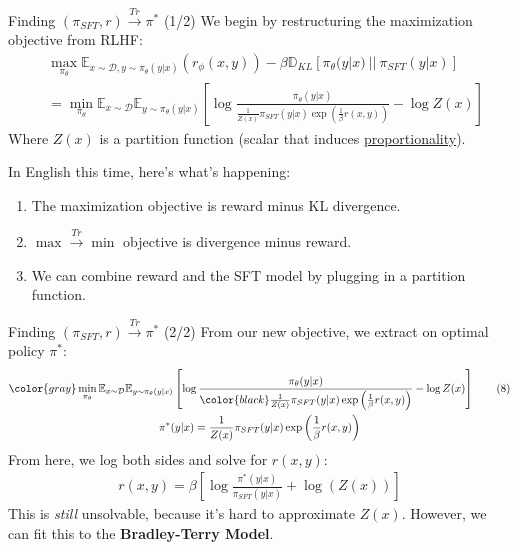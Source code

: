 \documentclass{beamer}
\begin{document}
\begin{frame}{Finding $(\pi_{SFT},r) \stackrel{Tr}{\rightarrow} \pi^*$ (1/2)}
	We begin by restructuring the maximization objective from RLHF:
	\begin{align}
		&\max_{\pi_\theta}\mathbb{E}_{x\sim\mathcal{D}, y \sim \pi_\theta(y|x)}(r_\phi(x,y)) -\beta \mathbb{D}_{KL}[\pi_\theta(y|x)~||~\pi_{SFT}(y|x)] \tag{4} \\
		&= \min_{\pi_\theta}\mathbb{E}_{x \sim \mathcal{D}}\mathbb{E}_{y \sim \pi_{\theta}(y|x)} \left[ \log \frac{\pi_\theta(y|x)}{\frac{1}{Z(x)} \pi_{SFT}(y|x)\exp\left(\frac{1}{\beta}r(x,y)\right)} - \log Z(x) \right]
	\end{align}
	Where $Z(x)$ is a partition function (scalar that induces \underline{proportionality}). \pause \newline

	In English this time, here's what's happening:
	\begin{enumerate}[label=\arabic*.]
		\item The maximization objective is reward minus KL divergence. \pause
		\item $\max \stackrel{Tr}{\rightarrow} \min$ objective is divergence minus reward. \pause
		\item We can combine reward and the SFT model by plugging in a partition function.
	\end{enumerate}
\end{frame}

\begin{frame}{Finding $(\pi_{SFT},r) \stackrel{Tr}{\rightarrow} \pi^*$ (2/2)}
	From our new objective, we extract on optimal policy $\pi^*$:
	\begin{gather}
		\color{gray} \min_{\pi_\theta}\mathbb{E}_{x \sim \mathcal{D}}\mathbb{E}_{y \sim \pi_{\theta}(y|x)} \left[ \log \frac{\pi_\theta(y|x)}{\color{black} \frac{1}{Z(x)} \pi_{SFT}(y|x)\exp\left(\frac{1}{\beta}r(x,y)\right)} - \log Z(x) \right] \tag{8} \\
		\pi^*(y|x) = \frac{1}{Z(x)} \pi_{SFT}(y|x)\exp\left(\frac{1}{\beta}r(x,y)\right)
	\end{gather} \pause
	From here, we log both sides and solve for $r(x,y)$:
	\begin{gather}
		r(x,y) = \beta \left[\log \frac{\pi^*(y|x)}{\pi_{SFT}(y|x)} + \log(Z(x)) \right] \label{eq:10}
	\end{gather} \pause
	This is \textit{still} unsolvable, because it's hard to approximate $Z(x)$. However, we can fit this to the \textbf{Bradley-Terry Model}.
\end{frame}
\end{document}
